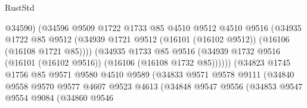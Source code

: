 \begin{lexlean}{RustStd}
\begin{coremodule}
                                      @34590)
                                    (@34596
                                      @9509
                                      @1722
                                      @1733
                                      @85
                                      @4510
                                      @9512
                                      @4510
                                      @9516
                                      (@34935
                                        @1722
                                        @85
                                        @9512
                                        (@34939
                                          @1721
                                          @9512
                                          (@16101 (@16102 @9512))
                                          (@16106 (@16108 @1721 @85))))
                                      (@34935
                                        @1733
                                        @85
                                        @9516
                                        (@34939
                                          @1732
                                          @9516
                                          (@16101 (@16102 @9516))
                                          (@16106 (@16108 @1732 @85))))))
                                  (@34823
                                    @1745
                                    @1756
                                    @85
                                    @9571
                                    @9580
                                    @4510
                                    @9589
                                    (@34833
                                      @9571
                                      @9578
                                      @9111
                                      (@34840
                                        @9558
                                        @9570
                                        @9577
                                        @4607
                                        @9523
                                        @4613
                                        (@34848
                                          @9547
                                          @9556
                                          (@34853
                                            @9547
                                            @9554
                                            @9084
                                            (@34860
                                              @9546

\end{coremodule}
\end{lexlean}
